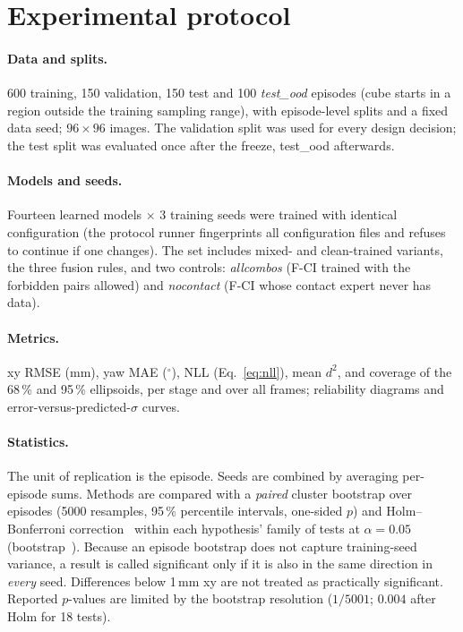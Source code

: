 \documentclass[11pt,a4paper]{article}
\begin{document}
\section{Experimental protocol}
\label{sec:prereg}
\paragraph{Data and splits.} 600 training, 150 validation, 150 test and 100 \emph{test\_ood} episodes (cube starts in a region outside the training sampling range), with episode-level splits and a fixed data seed; $96{\times}96$ images. The validation split was used for every design decision; the test split was evaluated once after the freeze, test\_ood afterwards.

\paragraph{Models and seeds.} Fourteen learned models $\times$ 3 training seeds were trained with identical configuration (the protocol runner fingerprints all configuration files and refuses to continue if one changes). The set includes mixed- and clean-trained variants, the three fusion rules, and two controls: \emph{allcombos} (F-CI trained with the forbidden pairs allowed) and \emph{nocontact} (F-CI whose contact expert never has data).

\paragraph{Metrics.} xy RMSE (mm), yaw MAE ($^\circ$), NLL (Eq.~\ref{eq:nll}), mean $d^2$, and coverage of the 68\,\% and 95\,\% ellipsoids, per stage and over all frames; reliability diagrams and error-versus-predicted-$\sigma$ curves.

\paragraph{Statistics.} The unit of replication is the episode. Seeds are combined by averaging per-episode sums. Methods are compared with a \emph{paired} cluster bootstrap over episodes (5000 resamples, 95\,\% percentile intervals, one-sided $p$) and Holm--Bonferroni correction~\cite{holm1979} within each hypothesis' family of tests at $\alpha=0.05$ (bootstrap~\cite{efron1979}). Because an episode bootstrap does not capture training-seed variance, a result is called significant only if it is also in the same direction in \emph{every} seed. Differences below 1\,mm xy are not treated as practically significant. Reported $p$-values are limited by the bootstrap resolution ($1/5001$; $0.004$ after Holm for 18 tests).
\end{document}
